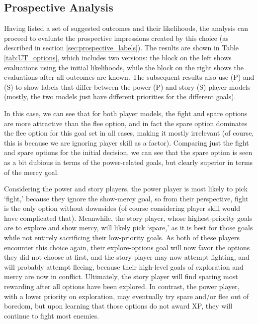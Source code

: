\documentclass[arts,article,submit,moreauthors,pdftex,10pt,a4paper]{Definitions/mdpi}
\begin{document}
\subsection{Prospective Analysis}

Having listed a set of suggested outcomes and their likelihoods, the analysis can proceed to evaluate the prospective impressions created by this choice (as described in section \ref{sec:prospective_labels}).
%
The results are shown in Table \ref{tab:UT_options}, which includes two versions: the block on the left shows evaluations using the initial likelihoods, while the block on the right shows the evaluations after all outcomes are known.
%
The subsequent results also use (P) and (S) to show labels that differ between the power (P) and story (S) player models (mostly, the two models just have different priorities for the different goals).


In this case, we can see that for both player models, the fight and spare options are more attractive than the flee option, and in fact the spare option dominates the flee option for this goal set in all cases, making it mostly irrelevant (of course, this is because we are ignoring player skill as a factor).
%
Comparing just the fight and spare options for the initial decision, we can see that the spare option is seen as a bit dubious in terms of the power-related goals, but clearly superior in terms of the mercy goal.


Considering the power and story players, the power player is most likely to pick `fight,' because they ignore the show-mercy goal, so from their perspective, fight is the only option without downsides (of course considering player skill would have complicated that).
%
Meanwhile, the story player, whose highest-priority goals are to explore and show mercy, will likely pick `spare,' as it is best for those goals while not entirely sacrificing their low-priority goals.
%
As both of these players encounter this choice again, their explore-options goal will now favor the options they did not choose at first, and the story player may now attempt fighting, and will probably attempt fleeing, because their high-level goals of exploration and mercy are now in conflict.
%
Ultimately, the story player will find sparing most rewarding after all options have been explored.
%
In contrast, the power player, with a lower priority on exploration, may eventually try spare and/or flee out of boredom, but upon learning that those options do not award XP, they will continue to fight most enemies.
\end{document}
